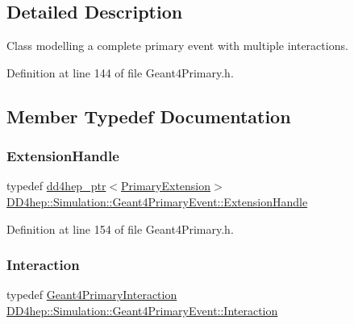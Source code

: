\subsection{Detailed Description}
Class modelling a complete primary event with multiple interactions. 

Definition at line 144 of file Geant4\+Primary.\+h.



\subsection{Member Typedef Documentation}
\hypertarget{class_d_d4hep_1_1_simulation_1_1_geant4_primary_event_acfe0b3b7ad6f183fe75a6539b4470418}{}\label{class_d_d4hep_1_1_simulation_1_1_geant4_primary_event_acfe0b3b7ad6f183fe75a6539b4470418} 
\subsubsection{\texorpdfstring{Extension\+Handle}{ExtensionHandle}}
{\footnotesize\ttfamily typedef \hyperlink{class_d_d4hep_1_1dd4hep__ptr}{dd4hep\+\_\+ptr}$<$\hyperlink{class_d_d4hep_1_1_simulation_1_1_primary_extension}{Primary\+Extension}$>$ \hyperlink{class_d_d4hep_1_1_simulation_1_1_geant4_primary_event_acfe0b3b7ad6f183fe75a6539b4470418}{D\+D4hep\+::\+Simulation\+::\+Geant4\+Primary\+Event\+::\+Extension\+Handle}}



Definition at line 154 of file Geant4\+Primary.\+h.

\hypertarget{class_d_d4hep_1_1_simulation_1_1_geant4_primary_event_afe42410b9331b521808a49120f402bd9}{}\label{class_d_d4hep_1_1_simulation_1_1_geant4_primary_event_afe42410b9331b521808a49120f402bd9} 
\subsubsection{\texorpdfstring{Interaction}{Interaction}}
{\footnotesize\ttfamily typedef \hyperlink{class_d_d4hep_1_1_simulation_1_1_geant4_primary_interaction}{Geant4\+Primary\+Interaction} \hyperlink{class_d_d4hep_1_1_simulation_1_1_geant4_primary_event_afe42410b9331b521808a49120f402bd9}{D\+D4hep\+::\+Simulation\+::\+Geant4\+Primary\+Event\+::\+Interaction}}



